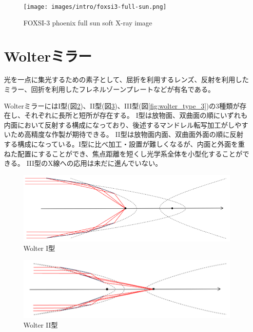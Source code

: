 \documentclass[dvipdfmx,autodetect-engine]{jreport}
\begin{document}
\begin{figure}[h!]
\centering
\texttt{[image: images/intro/foxsi3-full-sun.png]}
\caption{FOXSI-3 phoenix full sun soft X-ray image}
\label{fig:foxsi-fullsun-image}
\end{figure}

\section{Wolterミラー}

光を一点に集光するための素子として、屈折を利用するレンズ、反射を利用したミラー、回折を利用したフレネルゾーンプレートなどが有名である。

WolterミラーにはI型(図\ref{fig:wolter_type_1})、II型(図\ref{fig:wolter_type_2})、III型(図\ref{fig:wolter_type_3})の3種類が存在し、それぞれに長所と短所が存在する。
I型は放物面、双曲面の順にいずれも内面において反射する構成になっており、後述するマンドレル転写加工がしやすいため高精度な作製が期待できる。
II型は放物面内面、双曲面外面の順に反射する構成になっている。I型に比べ加工・設置が難しくなるが、内面と外面を重ねた配置にすることができ、焦点距離を短くし光学系全体を小型化することができる。
III型のX線への応用は未だに進んでいない。

\begin{figure}[h!]
\centering
\includegraphics[scale=0.4]{images/intro/wolter_type_1.png}
\caption{Wolter I型}
\label{fig:wolter_type_1}
\end{figure}

\begin{figure}[h!]
\centering
\includegraphics[scale=0.4]{images/intro/wolter_type_2.png}
\caption{Wolter II型}
\label{fig:wolter_type_2}
\end{figure}
\end{document}
